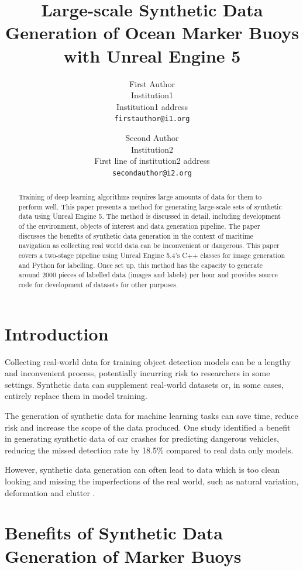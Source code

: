 \documentclass[10pt,twocolumn,letterpaper]{article}
\title{Large-scale Synthetic Data Generation of Ocean Marker Buoys with Unreal Engine 5}
\author{First Author\\
Institution1\\
Institution1 address\\
{\tt\small firstauthor@i1.org}
\and
Second Author\\
Institution2\\
First line of institution2 address\\
{\tt\small secondauthor@i2.org}
}
\begin{document}
\maketitle

\begin{abstract}
    Training of deep learning algorithms requires large amounts of data for them to perform well. This paper presents a method for generating large-scale sets of synthetic data using Unreal Engine 5. The method is discussed in detail, including development of the environment, objects of interest and data generation pipeline. The paper discusses the benefits of synthetic data generation in the context of maritime navigation as collecting real world data can be inconvenient or dangerous. This paper covers a two-stage pipeline using Unreal Engine 5.4's C++ classes for image generation and Python for labelling. Once set up, this method has the capacity to generate around 2000 pieces of labelled data (images and labels) per hour and provides source code for development of datasets for other purposes.
    \end{abstract}

\section{Introduction}

Collecting real-world data for training object detection models can be a lengthy and inconvenient process, potentially incurring risk to researchers in some settings. Synthetic data can supplement real-world datasets or, in some cases, entirely replace them in model training.

The generation of synthetic data for machine learning tasks can save time, reduce risk and increase the scope of the data produced. One study identified a benefit in generating synthetic data of car crashes for predicting dangerous vehicles, reducing the missed detection rate by 18.5\% compared to real data only models. \cite{Kim_Lee_Hwang_Suh_2019} 

However, synthetic data generation can often lead to data which is too clean looking and missing the imperfections of the real world, such as natural variation, deformation and clutter \cite{Feng_2024_CVPR}. 

\section{Benefits of Synthetic Data Generation of Marker Buoys}
\end{document}
